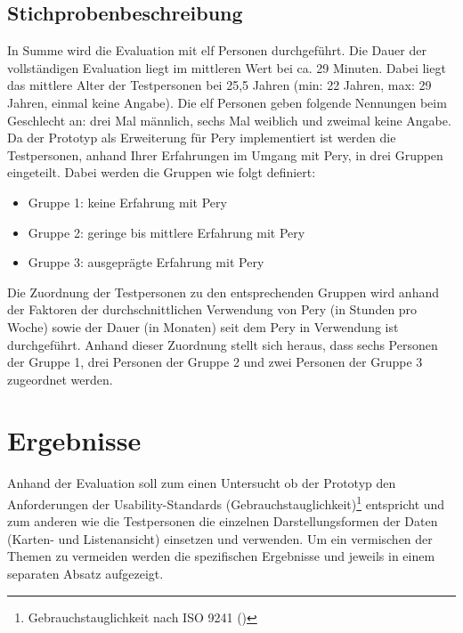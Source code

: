 \documentclass[Bachelorarbeit.tex]{subfiles}
\begin{document}
\subsection{Stichprobenbeschreibung}
\label{Stichproben}
In Summe wird die Evaluation mit elf Personen durchgeführt. 
Die Dauer der vollständigen Evaluation liegt im mittleren Wert bei ca. 29 Minuten.
Dabei liegt das mittlere Alter der Testpersonen bei 25,5 Jahren (min: 22 Jahren, max: 29 Jahren, einmal keine Angabe). 
Die elf Personen geben folgende Nennungen beim Geschlecht an: drei Mal männlich, sechs Mal weiblich und zweimal keine Angabe.
Da der Prototyp als Erweiterung für Pery implementiert ist werden die Testpersonen, anhand Ihrer Erfahrungen im Umgang mit Pery, in drei Gruppen eingeteilt.
Dabei werden die Gruppen wie folgt definiert: 
\begin{itemize}		
	\item Gruppe 1: keine Erfahrung mit Pery 
	\item Gruppe 2: geringe bis mittlere Erfahrung mit Pery
	\item Gruppe 3: ausgeprägte Erfahrung mit Pery
\end{itemize}
Die Zuordnung der Testpersonen zu den entsprechenden Gruppen wird anhand der Faktoren der durchschnittlichen Verwendung von Pery (in Stunden pro Woche) sowie der Dauer (in Monaten) seit dem Pery in Verwendung ist durchgeführt.
Anhand dieser Zuordnung stellt sich heraus, dass sechs Personen der Gruppe 1, drei Personen der Gruppe 2 und zwei Personen der Gruppe 3 zugeordnet werden. 


\section{Ergebnisse}
\label{Ergebnisse}
Anhand der Evaluation soll zum einen Untersucht ob der Prototyp den Anforderungen der Usability-Standards (Gebrauchstauglichkeit)\footnote{Gebrauchstauglichkeit nach ISO 9241 (\cite[siehe:][Abs.: 3.1 Gebrauchstauglichkeit]{Iso9241_11})} entspricht und zum anderen wie die Testpersonen die einzelnen Darstellungsformen der Daten (Karten- und Listenansicht) einsetzen und verwenden. 
Um ein vermischen der Themen zu vermeiden werden die spezifischen Ergebnisse  und  jeweils in einem separaten Absatz aufgezeigt.
\end{document}
